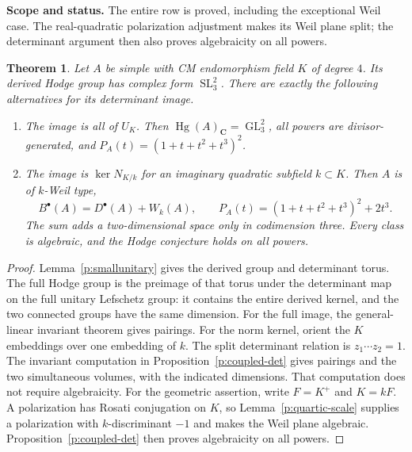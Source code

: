 \documentclass[10pt,reqno]{article}
\theoremstyle{emphasizedplain}
\newtheorem{theorem}{Theorem}[section]
\theoremstyle{emphasizeddefinition}
\theoremstyle{emphasizeddefinition}
\DeclareMathOperator{\Hg}{Hg}
\DeclareMathOperator{\GL}{GL}
\DeclareMathOperator{\SL}{SL}
\newcommand{\C}{\mathbf C}
\newcommand{\status}[1]{%
  \par\nobreak\smallskip\noindent
  {\setlength{\fboxsep}{7pt}%
   \colorbox{ScopeBackground}{%
    \parbox{\dimexpr\linewidth-2\fboxsep\relax}{%
     \small\textbf{\textcolor{HeadingInk}{Scope and status.}} #1}}}%
  \par\nobreak\medskip}
\renewcommand{\small}{\fontsize{8.4}{10}\selectfont}
\begin{document}
\status{The entire row is proved, including the exceptional Weil case.
The real-quadratic polarization adjustment makes its Weil plane split;
the determinant argument then also proves algebraicity on all powers.}
\begin{theorem}
Let $A$ be simple with CM endomorphism field $K$ of degree $4$.
Its derived Hodge group has complex form $\SL_{3}^{2}$.
There are exactly the following alternatives for its determinant image.
\begin{enumerate}
\item The image is all of $U_K$. Then $\Hg(A)_\C=\GL_{3}^{2}$,
all powers are divisor-generated, and $P_A(t)=(1+t+t^2+t^3)^2$.
\item The image is $\ker N_{K/k}$ for an imaginary quadratic subfield
$k\subset K$. Then $A$ is of $k$-Weil type,
\[
 B^\bullet(A)=D^\bullet(A)+W_k(A),\qquad
 P_A(t)=(1+t+t^2+t^3)^2+2t^3.
\]
The sum adds a two-dimensional space only in codimension three.
Every class is algebraic, and the Hodge conjecture holds on all powers.
\end{enumerate}
\end{theorem}
\begin{proof}
Lemma~\ref{p:smallunitary} gives the derived group and determinant torus.
The full Hodge group is the preimage of that torus under the determinant
map on the full unitary Lefschetz group: it contains the entire derived
kernel, and the two connected groups have the same dimension.
For the full image, the general-linear invariant theorem gives pairings.
For the norm kernel, orient the $K$ embeddings over one embedding of $k$.
The split determinant relation is $z_1\cdots z_{2}=1$.
The invariant computation in Proposition~\ref{p:coupled-det} gives pairings
and the two simultaneous volumes, with the indicated dimensions. That
computation does not require algebraicity. For the geometric assertion,
write $F=K^+$ and $K=kF$. A polarization has Rosati conjugation on $K$,
so Lemma~\ref{p:quartic-scale} supplies a polarization with $k$-discriminant
$-1$ and makes the Weil plane algebraic. Proposition~\ref{p:coupled-det}
then proves algebraicity on all powers.
\end{proof}
\end{document}

